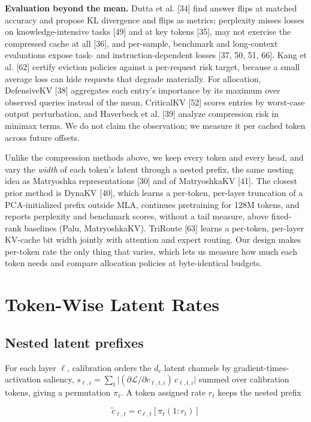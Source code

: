 \documentclass[10pt]{article}
\begin{document}
\textbf{Evaluation beyond the mean.} Dutta et al. [34] find answer flips at matched accuracy and propose KL divergence and flips as metrics; perplexity misses losses on knowledge-intensive tasks [49] and at key tokens [35], may not exercise the compressed cache at all [36], and per-sample, benchmark and long-context evaluations expose task- and instruction-dependent losses [37, 50, 51, 66]. Kang et al. [62] certify eviction policies against a per-request risk target, because a small average loss can hide requests that degrade materially. For allocation, DefensiveKV [38] aggregates each entry's importance by its maximum over observed queries instead of the mean, CriticalKV [52] scores entries by worst-case output perturbation, and Haverbeck et al. [39] analyze compression risk in minimax terms. We do not claim the observation; we measure it per cached token across future offsets.

Unlike the compression methods above, we keep every token and every head, and vary the \textit{width} of each token's latent through a nested prefix, the same nesting idea as Matryoshka representations [30] and of MatryoshkaKV [41]. The closest prior method is DynaKV [40], which learns a per-token, per-layer truncation of a PCA-initialized prefix outside MLA, continues pretraining for 128M tokens, and reports perplexity and benchmark scores, without a tail measure, above fixed-rank baselines (Palu, MatryoshkaKV). TriRoute [63] learns a per-token, per-layer KV-cache bit width jointly with attention and expert routing. Our design makes per-token rate the only thing that varies, which lets us measure how much each token needs and compare allocation policies at byte-identical budgets.

\section{Token-Wise Latent Rates}

\subsection{Nested latent prefixes}

For each layer $\ell$, calibration orders the $d_c$ latent channels by gradient-times-activation saliency, $s_{\ell,i}=\sum_t\lvert(\partial\mathcal L/\partial c_{\ell,t,i})\,c_{\ell,t,i}\rvert$ summed over calibration tokens, giving a permutation $\pi_\ell$. A token assigned rate $r_t$ keeps the nested prefix

\[\tilde c_{\ell,t}=c_{\ell,t}[\pi_\ell(1:r_t)]\]
\end{document}
